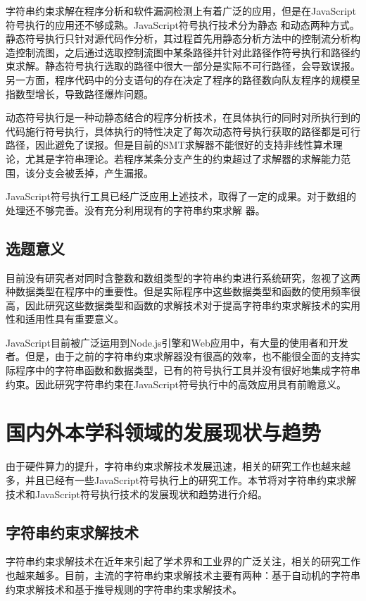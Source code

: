 字符串约束求解在程序分析和软件漏洞检测上有着广泛的应用，但是在JavaScript符号执行的应用还不够成熟。JavaScript符号执行技术分为静态\cite{safe} \cite{safe_ext}\cite{safe_str}和动态\cite{jalangi}\cite{expose_2017}\cite{expose_2019}\cite{aratha}两种方式。静态符号执行只针对源代码作分析，其过程首先用静态分析方法中的控制流分析构造控制流图，之后通过选取控制流图中某条路径并针对此路径作符号执行和路径约束求解。静态符号执行选取的路径中很大一部分是实际不可行路径，会导致误报。另一方面，程序代码中的分支语句的存在决定了程序的路径数向队友程序的规模呈指数型增长，导致路径爆炸问题。

动态符号执行是一种动静态结合的程序分析技术，在具体执行的同时对所执行到的代码施行符号执行，具体执行的特性决定了每次动态符号执行获取的路径都是可行路径，因此避免了误报。但是目前的SMT求解器不能很好的支持非线性算术理论，尤其是字符串理论。若程序某条分支产生的约束超过了求解器的求解能力范围，该分支会被丢掉，产生漏报。

JavaScript符号执行工具已经广泛应用上述技术，取得了一定的成果。对于数组的处理还不够完善。没有充分利用现有的字符串约束求解
器。

\subsection{选题意义}
目前没有研究者对同时含整数和数组类型的字符串约束进行系统研究，忽视了这两种数据类型在程序中的重要性。但是实际程序中这些数据类型和函数的使用频率很高，因此研究这些数据类型和函数的求解技术对于提高字符串约束求解技术的实用性和适用性具有重要意义。

JavaScript目前被广泛运用到Node.js引擎和Web应用中，有大量的使用者和开发者。但是，由于之前的字符串约束求解器没有很高的效率，也不能很全面的支持实际程序中的字符串函数和数据类型，已有的符号执行工具并没有很好地集成字符串约束。因此研究字符串约束在JavaScript符号执行中的高效应用具有前瞻意义。


\section{国内外本学科领域的发展现状与趋势}
由于硬件算力的提升，字符串约束求解技术发展迅速，相关的研究工作也越来越多，并且已经有一些JavaScript符号执行上的研究工作。本节将对字符串约束求解技术和JavaScript符号执行技术的发展现状和趋势进行介绍。
\subsection{字符串约束求解技术}
字符串约束求解技术在近年来引起了学术界和工业界的广泛关注，相关的研究工作也越来越多。目前，主流的字符串约束求解技术主要有两种：基于自动机的字符串约束求解技术和基于推导规则的字符串约束求解技术。

